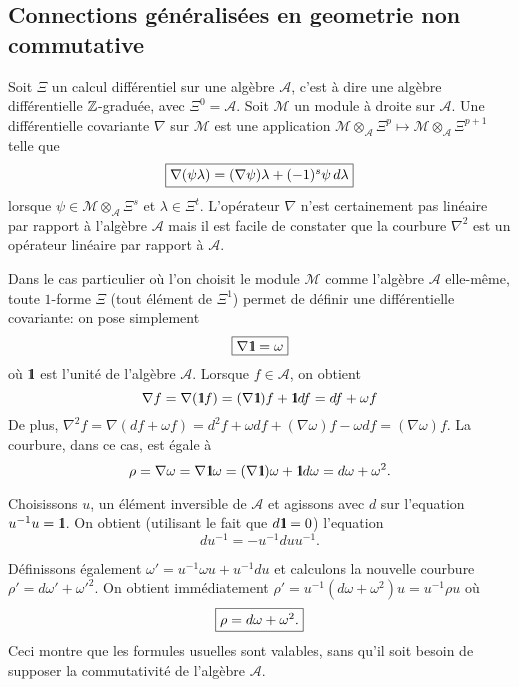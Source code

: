  
\subsection{Connections g\'en\'eralis\'ees en  geometrie non commutative}

Soit $\Xi$ un calcul diff\'erentiel sur une alg\`ebre $\mathcal A$, 
c'est \`a dire une alg\`ebre diff\'erentielle $\mathbb{Z}$-gradu\'ee, avec 
$\Xi^{0}  = \mathcal A$. Soit $\mathcal M$ un module \`a droite sur 
$\mathcal A$.
Une diff\'erentielle covariante $\nabla$ sur $\mathcal M$ est une 
application
 ${\mathcal M} \otimes_{\mathcal A} \Xi^{p} \mapsto {\mathcal M} 
\otimes 
 _{\mathcal A} \Xi^{p+1}$ telle que
 $$ 
 \mbox{\fbox{$
 \nabla( \psi \lambda) = (\nabla \psi) \lambda + (-1)^s \psi \, d \lambda 
$}}
$$
lorsque $\psi \in {\mathcal M} \otimes_{\mathcal A} \Xi^{s}$ et
 $\lambda \in \Xi^{t}$. L'op\'erateur
 $\nabla$ n'est certainement pas lin\'eaire par rapport \`a l'alg\`ebre $\mathcal 
A$ mais il est facile de constater que la courbure $\nabla^{2}$ est 
un op\'erateur lin\'eaire par rapport \`a  $\mathcal A$. 

Dans le cas particulier o\`u l'on choisit le  module  $\mathcal M$ 
comme l'alg\`ebre  $\mathcal A$ elle-m\^eme, toute $1$-forme $\Xi$ 
(tout \'el\'ement de 
$\Xi^{1}$) permet de d\'efinir une diff\'erentielle covariante: on pose 
simplement
$$
\mbox{\fbox{$
\nabla \mbox{\rm 1}\hskip-3pt \mbox{\rm l} = \omega
$}}
$$
 o\`u $\mbox{\rm 1}\hskip-3pt \mbox{\rm l}$ est l'unit\'e de l'alg\`ebre
$\mathcal A$.
Lorsque $f \in \mathcal A$, on obtient $$\nabla f = \nabla (\mbox{\rm 1}\hskip-3pt \mbox{\rm l} f) = 
(\nabla \mbox{\rm 1}\hskip-3pt \mbox{\rm l}) f + \mbox{\rm 1}\hskip-3pt \mbox{\rm l} df = df + \omega f$$
De plus, $\nabla^{2} f = \nabla (df + \omega f) = d^{2}f + \omega 
df + (\nabla \omega) f - \omega df = (\nabla  \omega) f$. La 
courbure, dans ce cas, est \'egale \`a
$$\rho  =  \nabla \omega = \nabla \mbox{\rm 1}\hskip-3pt \mbox{\rm l} \omega = (\nabla \mbox{\rm 1}\hskip-3pt \mbox{\rm l}) 
\omega + 
\mbox{\rm 1}\hskip-3pt \mbox{\rm l} d \omega = d \omega + \omega ^{2}.$$

Choisissons $u$, un \'el\'ement inversible de $\mathcal A$ et agissons 
avec $d$ sur l'equation $u^{-1} u = \mbox{\rm 1}\hskip-3pt \mbox{\rm l}$. On obtient (utilisant le fait que 
$d\mbox{\rm 1}\hskip-3pt \mbox{\rm l} = 0$) l'equation 
$$du^{-1} = - u^{-1} du u^{-1}.$$

D\'efinissons \'egalement $\omega' = u^{-1} 
\omega u + u^{-1} du$ et calculons la nouvelle courbure $\rho' = d\omega' 
+  
{\omega'}^2$. On obtient imm\'ediatement $\rho' = u^{-1} ( d \omega + 
\omega^2) u = u^{-1} \rho u$ o\`u $$
\mbox{\fbox{$ \rho = d \omega +
\omega^2.
$}}$$ Ceci montre que les formules usuelles sont valables,
sans qu'il soit  besoin de supposer la commutativit\'e de
l'alg\`ebre  $\mathcal A$.

